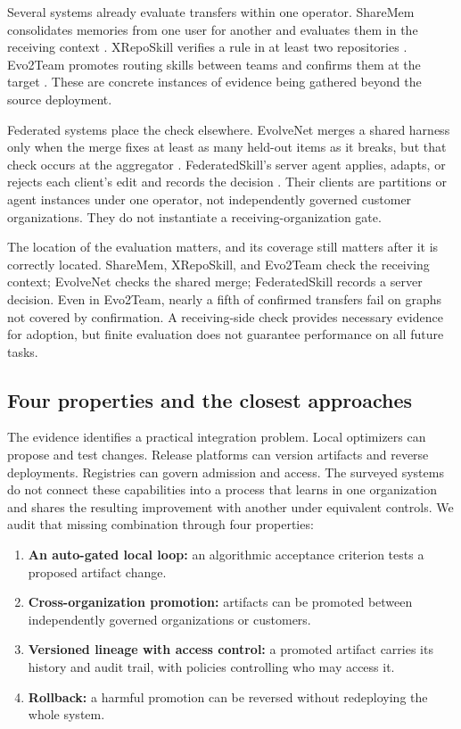 Several systems already evaluate transfers within one operator. ShareMem consolidates memories from one user for another and evaluates them in the receiving context \citep{hu2026sharemem}. XRepoSkill verifies a rule in at least two repositories \citep{guo2026xreposkill}. Evo2Team promotes routing skills between teams and confirms them at the target \citep{wang2026evo2team}. These are concrete instances of evidence being gathered beyond the source deployment.

Federated systems place the check elsewhere. EvolveNet merges a shared harness only when the merge fixes at least as many held-out items as it breaks, but that check occurs at the aggregator \citep{nie2026evolvenet}. FederatedSkill's server agent applies, adapts, or rejects each client's edit and records the decision \citep{yang2026federatedskill}. Their clients are partitions or agent instances under one operator, not independently governed customer organizations. They do not instantiate a receiving-organization gate.

The location of the evaluation matters, and its coverage still matters after it is correctly located. ShareMem, XRepoSkill, and Evo2Team check the receiving context; EvolveNet checks the shared merge; FederatedSkill records a server decision. Even in Evo2Team, nearly a fifth of confirmed transfers fail on graphs not covered by confirmation. A receiving-side check provides necessary evidence for adoption, but finite evaluation does not guarantee performance on all future tasks.

\subsection{Four properties and the closest approaches}\label{four-properties-and-the-closest-approaches}

The evidence identifies a practical integration problem. Local optimizers can propose and test changes. Release platforms can version artifacts and reverse deployments. Registries can govern admission and access. The surveyed systems do not connect these capabilities into a process that learns in one organization and shares the resulting improvement with another under equivalent controls. We audit that missing combination through four properties:

\begin{enumerate}
\def\labelenumi{(\alph{enumi})}
\tightlist
\item
  \textbf{An auto-gated local loop:} an algorithmic acceptance criterion tests a proposed artifact change.
\item
  \textbf{Cross-organization promotion:} artifacts can be promoted between independently governed organizations or customers.
\item
  \textbf{Versioned lineage with access control:} a promoted artifact carries its history and audit trail, with policies controlling who may access it.
\item
  \textbf{Rollback:} a harmful promotion can be reversed without redeploying the whole system.
\end{enumerate}


